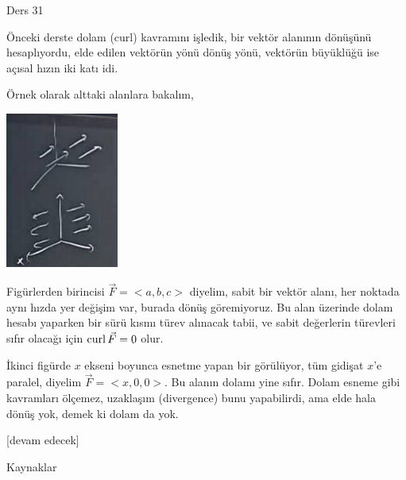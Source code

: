 \documentclass[12pt,fleqn]{article}\usepackage{../../common}
\begin{document}
Ders 31

Önceki derste dolam (curl) kavramını işledik, bir vektör alanının dönüşünü
hesaplıyordu, elde edilen vektörün yönü dönüş yönü, vektörün büyüklüğü ise
açısal hızın iki katı idi.

Örnek olarak alttaki alanlara bakalım,

\includegraphics[width=10em]{calc_multi_31_01.jpg}

Figürlerden birincisi $\vec{F} = < a,b,c > $ diyelim, sabit bir vektör
alanı, her noktada aynı hızda yer değişim var, burada dönüş göremiyoruz.
Bu alan üzerinde dolam hesabı yaparken bir sürü kısmı türev alınacak tabii,
ve sabit değerlerin türevleri sıfır olacağı için $\operatorname{curl} \vec{F} = 0$ olur.

İkinci figürde $x$ ekseni boyunca esnetme yapan bir görülüyor, tüm gidişat
$x$'e paralel, diyelim $\vec{F} = < x, 0, 0 >$. Bu alanın dolamı yine sıfır.
Dolam esneme gibi kavramları ölçemez, uzaklaşım (divergence) bunu yapabilirdi,
ama elde hala dönüş yok, demek ki dolam da yok.





[devam edecek]

Kaynaklar
\end{document}
